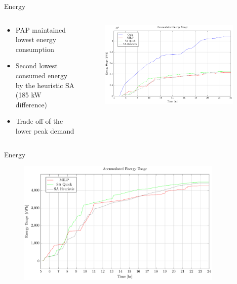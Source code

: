 \documentclass[aspectratio=169]{beamer}
\begin{document}
\begin{frame}[label={sec:org4533837}]{Energy}
\begin{columns}
\begin{column}{0.3\columnwidth}
\begin{itemize}
\item PAP maintained lowest energy consumption
\item Second lowest consumed energy by the heuristic SA (185 kW difference)
\item Trade off of the lower peak demand
\end{itemize}
\end{column}

\begin{column}{0.7\columnwidth}
\begin{figure}[htpb]
\centering
    \includegraphics[width=\textwidth]{img/sa-pap-paper-good/energy}
\end{figure}
\end{column}
\end{columns}
\end{frame}

\begin{frame}[label={sec:orgbbef77b}]{Energy}
\begin{figure}[htpb]
\centering
    \includegraphics[width=0.9\textwidth]{img/sa-pap-paper-good/energy-zoom}
\end{figure}
\end{frame}
\end{document}
